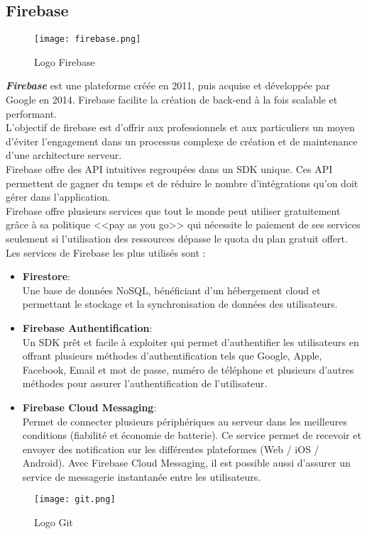 \subsection{Firebase}
\vspace{1cm}
\begin{figure}[H]
    \centering
    \texttt{[image: firebase.png]}
    \vspace{1cm}
    \captionsetup{justification=centering}

    \caption{Logo Firebase}
    \label{fig:firebase_logo}
\end{figure}
\textit{\textbf{Firebase}} \cite{firebase} est une plateforme créée en 2011, puis acquise et développée par Google en 2014. Firebase facilite la création de back-end à la fois scalable et performant.\\
\noindent L'objectif de firebase est d'offrir aux professionnels et aux particuliers un moyen d'éviter l'engagement dans un processus complexe de création et de maintenance d'une architecture serveur.\\
\noindent Firebase offre des API intuitives regroupées dans un SDK unique. Ces API permettent de gagner du temps et de réduire le nombre d'intégrations qu'on doit gérer dans l'application.\\
\noindent Firebase offre plusieurs services que tout le monde peut utiliser gratuitement grâce à sa politique <<pay as you go>> qui nécessite le paiement de ses services seulement si l'utilisation des ressources dépasse le quota du plan gratuit offert. Les services de Firebase les plus utilisés sont :
\begin{itemize}
    \item \textbf{Firestore}:\\ Une base de données NoSQL, bénéficiant d'un hébergement cloud et permettant le stockage et la synchronisation de données des utilisateurs.
    \item \textbf{Firebase Authentification}:\\ Un SDK prêt et facile à exploiter qui permet d'authentifier les utilisateurs en offrant plusieurs méthodes d'authentification tels que Google, Apple, Facebook, Email et mot de passe, numéro de téléphone et plusieurs d'autres méthodes pour assurer l'authentification de l'utilisateur.
    \item \textbf{Firebase Cloud Messaging}:\\ Permet de connecter plusieurs périphériques au serveur dans les meilleures conditions (fiabilité et économie de batterie). Ce service permet de recevoir et envoyer des notification sur les différentes plateformes (Web / iOS / Android). Avec Firebase Cloud Messaging, il est possible aussi d'assurer un service de messagerie instantanée entre les utilisateurs.
\end{itemize}
\begin{figure}[H]
    \centering
    \texttt{[image: git.png]}
    \vspace{1cm}
    \captionsetup{justification=centering}
    \caption{Logo Git}
    \label{fig:git_logo}
\end{figure}
